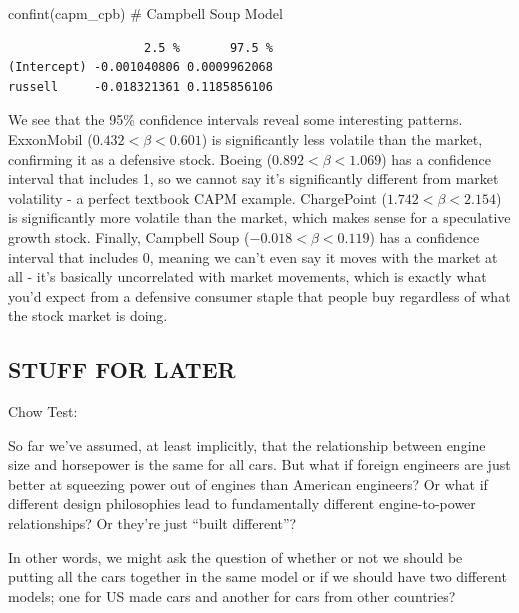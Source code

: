 \documentclass[
  letterpaper,
]{book}
\newenvironment{Shaded}{\begin{snugshade}}{\end{snugshade}}
\newcommand{\CommentTok}[1]{\textcolor[rgb]{0.37,0.37,0.37}{#1}}
\newcommand{\FunctionTok}[1]{\textcolor[rgb]{0.28,0.35,0.67}{#1}}
\newcommand{\NormalTok}[1]{\textcolor[rgb]{0.00,0.23,0.31}{#1}}
\begin{document}
\begin{Shaded}
\begin{Highlighting}[]
\FunctionTok{confint}\NormalTok{(capm\_cpb) }\CommentTok{\# Campbell Soup Model}
\end{Highlighting}
\end{Shaded}

\begin{verbatim}
                   2.5 %       97.5 %
(Intercept) -0.001040806 0.0009962068
russell     -0.018321361 0.1185856106
\end{verbatim}

We see that the 95\% confidence intervals reveal some interesting
patterns. ExxonMobil (\(0.432<\beta<0.601\)) is significantly less
volatile than the market, confirming it as a defensive stock. Boeing
(\(0.892<\beta<1.069\)) has a confidence interval that includes 1, so we
cannot say it's significantly different from market volatility - a
perfect textbook CAPM example. ChargePoint (\(1.742<\beta<2.154\)) is
significantly more volatile than the market, which makes sense for a
speculative growth stock. Finally, Campbell Soup
(\(-0.018<\beta<0.119\)) has a confidence interval that includes 0,
meaning we can't even say it moves with the market at all - it's
basically uncorrelated with market movements, which is exactly what
you'd expect from a defensive consumer staple that people buy regardless
of what the stock market is doing.

\subsection{STUFF FOR LATER}\label{stuff-for-later}

Chow Test:

So far we've assumed, at least implicitly, that the relationship between
engine size and horsepower is the same for all cars. But what if foreign
engineers are just better at squeezing power out of engines than
American engineers? Or what if different design philosophies lead to
fundamentally different engine-to-power relationships? Or they're just
``built different''?

In other words, we might ask the question of whether or not we should be
putting all the cars together in the same model or if we should have two
different models; one for US made cars and another for cars from other
countries?
\end{document}
